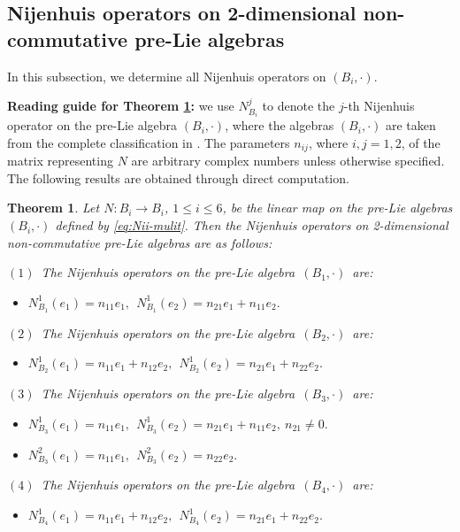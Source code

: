 \documentclass[12pt, reqno]{amsart}
\theoremstyle{plain}
\newtheorem{theorem}{Theorem}[section]
\begin{document}
\subsection{Nijenhuis operators on 2-dimensional non-commutative pre-Lie algebras}
In this subsection, we determine all Nijenhuis operators on $(B_i,\cdot)$.

\textbf{Reading guide for Theorem \ref{Ni ope on 2 non c}:} we use $N_{B_{i}}^j$ to denote the $j$-th Nijenhuis operator on the pre-Lie algebra $(B_{i}, \cdot)$, where the algebras $(B_{i}, \cdot)$ are taken from the complete classification in \cite{Bai-Meng}. The parameters $n_{ij}$, where $i,j=1,2$, of the matrix representing $N$ are arbitrary complex numbers unless otherwise specified. 
The following results are obtained through direct computation.
\begin{theorem}\label{Ni ope on 2 non c}
Let $N:B_i\rightarrow B_i$, $1\leq i\leq 6$, be the linear map on the pre-Lie algebras $(B_{i},\cdot)$ defined by \eqref{eq:Nii-mulit}. Then the Nijenhuis operators on 2-dimensional non-commutative pre-Lie algebras are as follows:


$(1)$~The Nijenhuis operators on the pre-Lie algebra~$(B_{1},\cdot)$~are:
\begin{itemize}
   \item[]  $N_{B_{1}}^1(e_1)=n_{11}e_1,~~ N_{B_{1}}^1(e_2)= n_{21}e_1+ n_{11}e_2.$
   \end{itemize}

$(2)$~The Nijenhuis operators on the pre-Lie algebra~$(B_{2},\cdot)$~are:
\begin{itemize}
   \item[]  $N_{B_{2}}^1(e_1)=n_{11}e_1+ n_{12}e_2 ,~~ N_{B_{2}}^1(e_2)= n_{21}e_1+ n_{22}e_2.$
   \end{itemize}

$(3)$~The Nijenhuis operators on the pre-Lie algebra~$(B_{3},\cdot)$~are:
\begin{itemize}
   \item[]  $N_{B_{3}}^1(e_1)=n_{11}e_1 ,~~ N_{B_{3}}^1(e_2)= n_{21}e_1+ n_{11}e_2,~n_{21}\neq0.$
   \item[]  $N_{B_{3}}^2(e_1)=n_{11}e_1 ,~~ N_{B_{3}}^2(e_2)= n_{22}e_2.$
 \end{itemize}

$(4)$~The Nijenhuis operators on the pre-Lie algebra~$(B_{4},\cdot)$~are:
\begin{itemize}
   \item[]  $N_{B_{4}}^1(e_1)=n_{11}e_1+ n_{12}e_2 ,~~ N_{B_{4}}^1(e_2)= n_{21}e_1+ n_{22}e_2.$
   \end{itemize}


\end{theorem}
\end{document}
